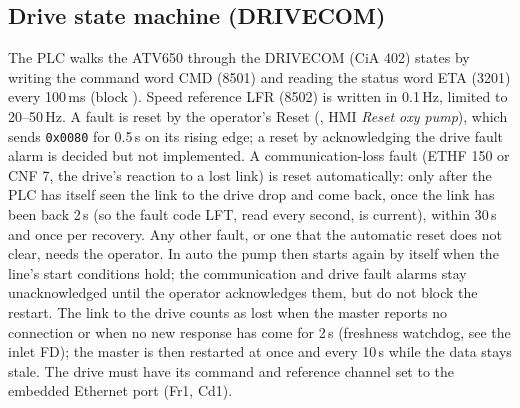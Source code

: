 \documentclass[11pt,a4paper]{article}
\begin{document}
\subsection{Drive state machine (DRIVECOM)}
The PLC walks the ATV650 through the DRIVECOM (CiA 402) states by writing the command word CMD
(8501) and reading the status word ETA (3201) every 100\,ms (block ).
Speed reference LFR (8502) is written in 0.1\,Hz, limited to 20--50\,Hz. A fault is reset by the
operator's Reset (, HMI \emph{Reset oxy pump}), which sends \texttt{0x0080}
for 0.5\,s on its rising edge; a reset by acknowledging the drive fault alarm is decided but not
implemented. A communication-loss fault (ETHF 150 or CNF 7, the drive's reaction to a lost link) is
reset automatically: only after the PLC has itself seen the link to the drive drop and come back, once
the link has been back 2\,s (so the fault code LFT, read every second, is current), within 30\,s and
once per recovery. Any other fault, or one that the automatic reset does not clear, needs the operator.
In auto the pump then starts again by itself when the line's start conditions hold; the communication
and drive fault alarms stay unacknowledged until the operator acknowledges them, but do not block the
restart. The link to the drive counts as lost when the master reports no connection or when no new
response has come for 2\,s (freshness watchdog, see the inlet FD); the master is then restarted at once
and every 10\,s while the data stays stale. The drive must have its command and reference channel set to
the embedded Ethernet port (Fr1, Cd1).
\end{document}
